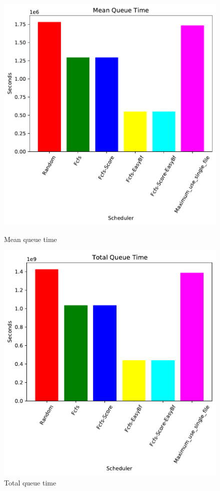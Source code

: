 \documentclass[a4paper]{article}
\begin{document}
\begin{figure}[H]
	\begin{minipage}[b]{0.5\linewidth}\centering\includegraphics[width=1\linewidth]{MBSS/plot/2021-05-23-800_Mean_queue_time4nodes.pdf}\caption{Mean queue time}\vspace{4ex}\end{minipage} 
	\begin{minipage}[b]{0.5\linewidth}\centering\includegraphics[width=1\linewidth]{MBSS/plot/2021-05-23-800_Total_queue_time4nodes.pdf}\caption{Total queue time}\vspace{4ex}\end{minipage}

\end{figure}
\end{document}
